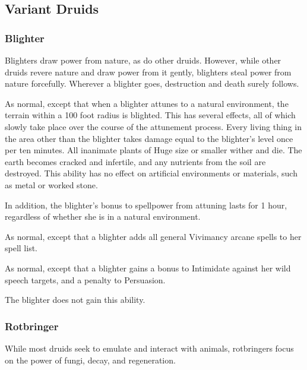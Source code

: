     \subsection{Variant Druids}

        \subsubsection{Blighter}

            Blighters draw power from nature, as do other druids. However, while other druids revere nature and draw power from it gently, blighters steal power from nature forcefully. Wherever a blighter goes, destruction and death surely follows.

             As normal, except that when a blighter attunes to a natural environment, the terrain within a 100 foot radius is blighted.
            This has several effects, all of which slowly take place over the course of the attunement process.
            Every living thing in the area other than the blighter takes damage equal to the blighter's level once per ten minutes.
            All inanimate plants of Huge size or smaller wither and die.
            The earth becomes cracked and infertile, and any nutrients from the soil are destroyed.
            This ability has no effect on artificial environments or materials, such as metal or worked stone.

            In addition, the blighter's bonus to spellpower from attuning lasts for 1 hour, regardless of whether she is in a natural environment.

             As normal, except that a blighter adds all general Vivimancy arcane spells to her spell list.

             As normal, except that a blighter gains a  bonus to Intimidate against her wild speech targets, and a  penalty to Persuasion.

             The blighter does not gain this ability.



        \subsubsection{Rotbringer}

            While most druids seek to emulate and interact with animals, rotbringers focus on the power of fungi, decay, and regeneration.

